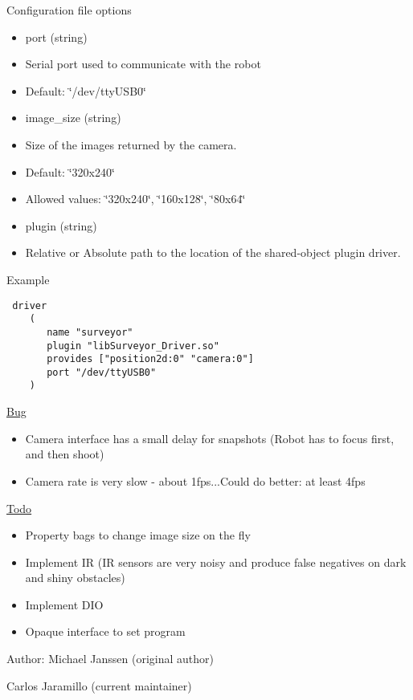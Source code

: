 \begin{Desc}
\item[Configuration file options]\end{Desc}
\begin{itemize}
\item port (string)\item Serial port used to communicate with the robot\item Default: \char`\"{}/dev/ttyUSB0\char`\"{}\item image\_\-size (string)\item Size of the images returned by the camera.\item Default: \char`\"{}320x240\char`\"{}\item Allowed values: \char`\"{}320x240\char`\"{}, \char`\"{}160x128\char`\"{}, \char`\"{}80x64\char`\"{}\item plugin (string)\item Relative or Absolute path to the location of the shared-object plugin driver.\end{itemize}


\begin{Desc}
\item[Example]\end{Desc}


\footnotesize\begin{verbatim}
 driver
    (
       name "surveyor"
       plugin "libSurveyor_Driver.so"
       provides ["position2d:0" "camera:0"]
       port "/dev/ttyUSB0"
    )
 \end{verbatim}
\normalsize


\begin{Desc}
\item[\hyperlink{bug__bug000001}{Bug}]\begin{itemize}
\item Camera interface has a small delay for snapshots (Robot has to focus first, and then shoot)\item Camera rate is very slow - about 1fps...Could do better: at least 4fps\end{itemize}
\end{Desc}
\begin{Desc}
\item[\hyperlink{todo__todo000001}{Todo}]\begin{itemize}
\item Property bags to change image size on the fly\item Implement IR (IR sensors are very noisy and produce false negatives on dark and shiny obstacles)\item Implement DIO\item Opaque interface to set program\end{itemize}
\end{Desc}
\begin{Desc}
\item[Author:]Michael Janssen (original author) 

Carlos Jaramillo (current maintainer) \end{Desc}



